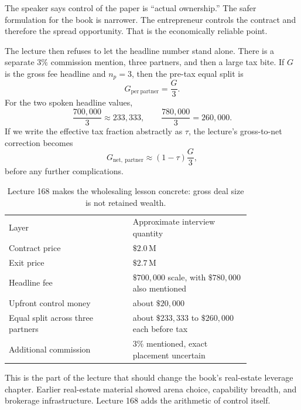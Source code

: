 \documentclass[11pt,oneside]{book}
\begin{document}
\begin{remark}
The speaker says control of the paper is ``actual ownership.'' The safer formulation for the book is narrower. The entrepreneur controls the contract and therefore the spread opportunity. That is the economically reliable point.
\end{remark}

The lecture then refuses to let the headline number stand alone. There is a separate \(3\%\) commission mention, three partners, and then a large tax bite. If \(G\) is the gross fee headline and \(n_p=3\), then the pre-tax equal split is
\begin{equation}
G_{\mathrm{per\ partner}} = \frac{G}{3}.
\end{equation}
For the two spoken headline values,
\begin{equation}
\frac{700{,}000}{3}\approx 233{,}333,
\qquad
\frac{780{,}000}{3}=260{,}000.
\end{equation}
If we write the effective tax fraction abstractly as \(\tau\), the lecture's gross-to-net correction becomes
\begin{equation}
G_{\mathrm{net,\ partner}} \approx (1-\tau)\frac{G}{3},
\end{equation}
before any further complications.

\begin{table}[h]
\centering
\begin{tabular}{p{0.42\linewidth}p{0.40\linewidth}}
Layer & Approximate interview quantity \\
Contract price & \(\$2.0\,\mathrm{M}\) \\
Exit price & \(\$2.7\,\mathrm{M}\) \\
Headline fee & \(\$700{,}000\) scale, with \(\$780{,}000\) also mentioned \\
Upfront control money & about \(\$20{,}000\) \\
Equal split across three partners & about \(\$233{,}333\) to \(\$260{,}000\) each before tax \\
Additional commission & \(3\%\) mentioned, exact placement uncertain \\
\end{tabular}
\caption{Lecture 168 makes the wholesaling lesson concrete: gross deal size is not retained wealth.}
\end{table}

This is the part of the lecture that should change the book's real-estate leverage chapter. Earlier real-estate material showed arena choice, capability breadth, and brokerage infrastructure. Lecture 168 adds the arithmetic of control itself.
\end{document}
